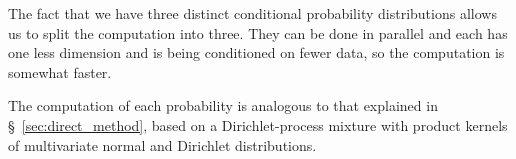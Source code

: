 \documentclass[\ifafour a4paper,12pt,\else a5paper,10pt,\fi%
onecolumn,oneside,article,%
british%
]{memoir}
\theoremstyle{remark}
\theoremstyle{innote}
\renewcommand*{\|}[1][]{\nonscript\:#1\vert\nonscript\:\mathopen{}}
\renewcommand*{\=}{\TextOrMath\texteq\eq}
\newcommand*{\sect}{\S}%
\begin{document}
The fact that we have three distinct conditional probability distributions
allows us to split the computation into three. They can be done in parallel
and each has one less dimension and is being conditioned on fewer data, so
the computation is somewhat faster.

The computation of each probability is analogous to that explained in
\sect~\ref{sec:direct_method}, based on a Dirichlet-process mixture with
product kernels of multivariate normal and Dirichlet distributions. 


\end{document}
